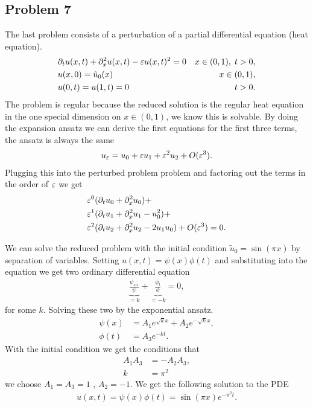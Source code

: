 \subsection{Problem 7}
The last problem consists of a perturbation of a partial differential
equation (heat equation).
\begin{align}
    &\partial_t u(x, t) + \partial_x^2 u(x,t) - \varepsilon u(x, t)^2 = 0
    &x\in (0, 1),\; t>0,\\
    &u(x, 0) = \tilde{u}_0(x)  &x\in(0, 1), \\
    &u(0, t) = u(1, t) = 0 & t>0.
\end{align}
The problem is regular because the reduced solution is the regular heat
equation in the one special dimension on $x\in (0, 1)$, we know this is
solvable. By doing the expansion ansatz we can derive the first equations
for the first three terms, the ansatz is always the same
\begin{align}
    u_\varepsilon = u_0 + \varepsilon u_1 + \varepsilon^2 u_2 + O(\varepsilon^3).
\end{align}
Plugging this into the perturbed problem problem and factoring out the terms
in the order of $\varepsilon$ we get
\begin{align}
    &\varepsilon^0 (\partial_t u_0 + \partial_x^2 u_0) + \\
    &\varepsilon^1 (\partial_t u_1 + \partial_x^2 u_1 - u_0^2) +\\
    &\varepsilon^2 (\partial_t u_2 + \partial_x^2 u_2 - 2u_1u_0)  + O(\varepsilon^3) = 0.
\end{align}

We can solve the reduced problem with the initial condition $\tilde{u}_0 =
\sin(\pi x)$ by separation of variables. Setting $u(x, t) = \psi(x) \phi(t)$
and substituting into the equation we get two ordinary differential equation
\begin{align}
    \underbrace{\frac{\psi_{xx}}{\psi}}_{=k}
    +\underbrace{\frac{\phi_t}{\phi}}_{=-k} =  0,
\end{align}
for some $k$. Solving these two by the exponential ansatz.
\begin{align}
    \psi(x) &= A_1 e^{\sqrt{k} x} +A_2 e^{-\sqrt{k} x},\\
    \phi(t) &= A_3 e^{-kt}.
\end{align}
With the initial condition we get the conditions that
\begin{align}
    A_1A_3 &= -A_2 A_3,\\
    k &= \pi^2
\end{align}
we choose $A_1 = A_3 = 1$ , $A_2 = -1$. We get the following solution to the
PDE
\begin{align}
    u(x, t) = \psi(x)\phi(t) = \sin(\pi x) e^{-\pi^2 t}.
\end{align}


